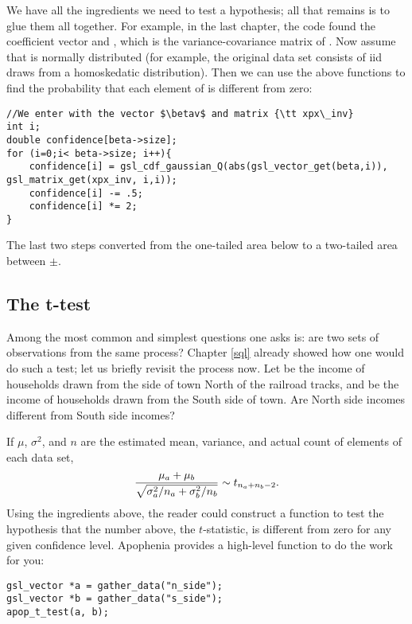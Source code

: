 We have all the ingredients we need to test a hypothesis; all that
remains is to glue them all together. For example, in the last chapter, the code
found the coefficient vector  and , which is the
variance-covariance matrix of .  Now assume that 
is normally distributed (for example, the original data set consists
of iid draws from a homoskedatic distribution). Then we can use the
above functions to find the probability that each element of 
is different from zero:

\lstset{texcl=true}
\begin{lstlisting}
//We enter with the vector $\betav$ and matrix {\tt xpx\_inv}
int i;
double confidence[beta->size];
for (i=0;i< beta->size; i++){
    confidence[i] = gsl_cdf_gaussian_Q(abs(gsl_vector_get(beta,i)), gsl_matrix_get(xpx_inv, i,i));
    confidence[i] -= .5;
    confidence[i] *= 2;
}
\end{lstlisting}
\lstset{texcl=false}
The last two steps converted from the one-tailed area below 
to a two-tailed area between $\pm$.


\subsection{The t-test} \label{ttest} 
Among the most common and simplest questions one asks is: are two 
sets of observations from the same process? Chapter \ref{sql} already showed how one
would do such a test; let us briefly revisit the process now.
Let  be the income of households
drawn from the side of town North of the railroad tracks, and
 be the income of households drawn from the South side of
town. Are North side incomes different from South side incomes? 

If $\mu$,
$\sigma^2$, and $n$ are the estimated mean, variance, and actual count
of elements of each data set,
$${\mu_a + \mu_b \over \sqrt{\sigma^2_a/n_a + \sigma^2_b/n_b}} \sim t_{n_a + n_b -2}.$$
Using the ingredients above, the reader could construct a function to
test the hypothesis that the number above, the $t$-statistic, is
different from zero for any given confidence level. Apophenia provides a
high-level function to do the work for you:

\begin{lstlisting}
gsl_vector *a = gather_data("n_side");
gsl_vector *b = gather_data("s_side");
apop_t_test(a, b);
\end{lstlisting}

